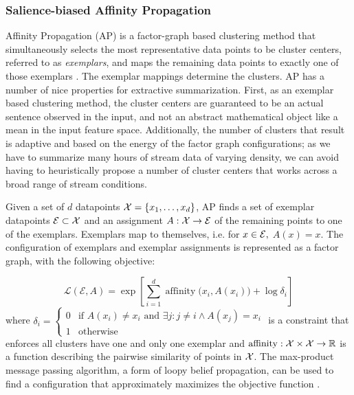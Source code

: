\subsubsection{Salience-biased Affinity Propagation}


    Affinity Propagation (AP) is a factor-graph based clustering
    method that simultaneously selects the most representative data points 
    to be cluster centers, referred to as \emph{exemplars},  and maps 
    the remaining data points to exactly one of those exemplars 
    \citep{frey2007clustering}. 
    The exemplar mappings determine the clusters.
    AP has a number of nice properties for extractive summarization.
    First, as an exemplar based clustering method, the cluster centers
    are guaranteed to be an actual sentence observed in the input, and not 
    an abstract mathematical object like a mean in the input 
    feature space.
    Additionally, the number of clusters that result is adaptive and 
    based on the energy of the factor graph configurations; as we have to 
    summarize many hours of stream data of varying density, we can avoid
    having to heuristically propose a number of cluster centers that works
    across a broad range of stream conditions.

    Given a set of $d$ datapoints $\mathcal{X} = \{x_1, \ldots, x_d\}$, 
    AP finds a set of
    exemplar datapoints $\mathcal{E} \subset \mathcal{X}$ and an assignment
    $A : \mathcal{X} \rightarrow\mathcal{E}$ of the 
    remaining points to one of the exemplars. Exemplars map to themselves,
    i.e. for $x \in \mathcal{E},$ $A(x) = x$. The configuration of exemplars
    and exemplar assignments is represented as a factor graph, 
    with the following objective:
    
    \[ \mathcal{L}(\mathcal{E}, A) 
        = \exp\left[
            \sum_{i=1}^d \operatorname{affinity}\Big(x_i, A(x_i)\Big) + 
          \log \delta_i \right] \]
    where $\delta_i = \begin{cases} 0 & \textrm{if $A(x_i) \neq x_i$ and $\exists j: j\neq i \wedge A(x_j)=x_i$} \\
1 & \textrm{otherwise}\end{cases}$ is a constraint that enforces all clusters
 have one and only one exemplar and $\operatorname{affinity}:\mathcal{X} 
 \times \mathcal{X} \rightarrow \mathbb{R} $
 is a function describing the pairwise similarity of points in 
 $\mathcal{X}$.
 The max-product message passing algorithm,
 a form of loopy belief propagation, can be used to find a configuration
 that approximately maximizes the objective function \citep{dueck2009affinity}.


